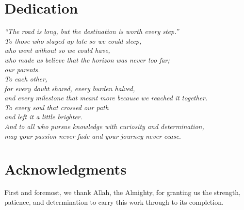 \documentclass[11pt,a4paper]{report}
\begin{document}
\chapter*{Dedication}
\vspace*{\fill}
\begin{center}

{\LARGE\textit{``The road is long, but the destination is worth every step.''}}\\[2cm]

{\Large\textit{To those who stayed up late so we could sleep,\\[0.2cm]
who went without so we could have,\\[0.2cm]
who made us believe that the horizon was never too far;\\[0.5cm]
our parents.}}\\[1.5cm]

{\Large\textit{To each other,\\[0.2cm]
for every doubt shared, every burden halved,\\[0.2cm]
and every milestone that meant more because we reached it together.}}\\[1.5cm]

{\Large\textit{To every soul that crossed our path\\[0.2cm]
and left it a little brighter.}}\\[1.5cm]

{\Large\textit{And to all who pursue knowledge with curiosity and determination,\\[0.2cm]
may your passion never fade and your journey never cease.}}

\end{center}
\vspace*{\fill}

\chapter*{Acknowledgments}

\vspace{0.5cm}

\noindent First and foremost, we thank Allah, the Almighty, for granting us the
strength, patience, and determination to carry this work through to its completion.
\end{document}
